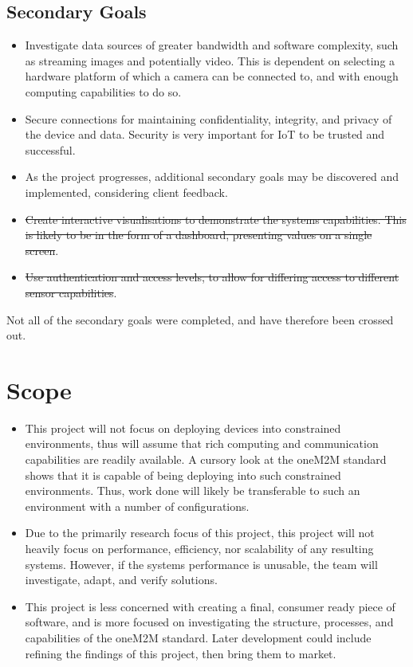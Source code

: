 \subsection{Secondary Goals}

\begin{itemize}
  \item Investigate data sources of greater bandwidth and software complexity, such as streaming images and potentially video. This is dependent on selecting a hardware platform of which a camera can be connected to, and with enough computing capabilities to do so.
  \item Secure connections for maintaining confidentiality, integrity, and privacy of the device and data. Security is very important for IoT to be trusted and successful.
  \item As the project progresses, additional secondary goals may be discovered and implemented, considering client feedback.
  \item \sout{Create interactive visualisations to demonstrate the systems capabilities. This is likely to be in the form of a dashboard, presenting values on a single screen}.
  \item \sout{Use authentication and access levels, to allow for differing access to different sensor capabilities}.
\end{itemize}

Not all of the secondary goals were completed, and have therefore been crossed out.

\section{Scope}

\begin{itemize}
  \item This project will not focus on deploying devices into constrained environments, thus will assume that rich computing and communication capabilities are readily available. A cursory look at the oneM2M standard shows that it is capable of being deploying into such constrained environments. Thus, work done will likely be transferable to such an environment with a number of configurations.
  \item Due to the primarily research focus of this project, this project will not heavily focus on performance, efficiency, nor scalability of any resulting systems. However, if the systems performance is unusable, the team will investigate, adapt, and verify solutions.
  \item This project is less concerned with creating a final, consumer ready piece of software, and is more focused on investigating the structure, processes, and capabilities of the oneM2M standard. Later development could include refining the findings of this project, then bring them to market.
\end{itemize}

\clearpage
